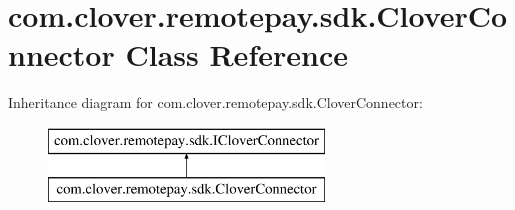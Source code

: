 \hypertarget{classcom_1_1clover_1_1remotepay_1_1sdk_1_1_clover_connector}{}\section{com.\+clover.\+remotepay.\+sdk.\+Clover\+Connector Class Reference}
\label{classcom_1_1clover_1_1remotepay_1_1sdk_1_1_clover_connector}


 


Inheritance diagram for com.\+clover.\+remotepay.\+sdk.\+Clover\+Connector\+:\begin{figure}[H]
\begin{center}
\leavevmode
\includegraphics[height=2.000000cm]{classcom_1_1clover_1_1remotepay_1_1sdk_1_1_clover_connector}
\end{center}
\end{figure}
